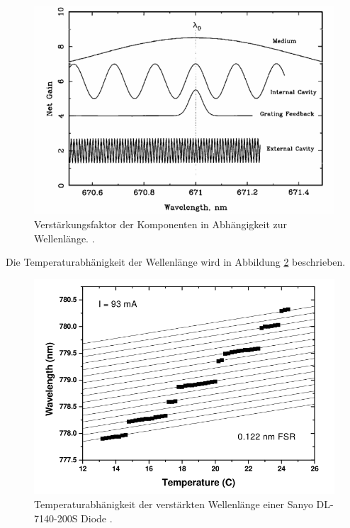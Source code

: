 \begin{figure}
    \centering
    \includegraphics[scale=0.50]{bilder/net_gain.png}
    \caption{Verstärkungsfaktor der Komponenten in Abhängigkeit zur Wellenlänge. \cite{diode_laser_spectroscopy}.}
    \label{fig:net_gain}
\end{figure}

Die Temperaturabhänigkeit der Wellenlänge wird in Abbildung \ref{fig:temperatur} beschrieben.

\begin{figure}
    \centering
    \includegraphics[scale=0.55]{bilder/temperatur.png}
    \caption{Temperaturabhänigkeit der verstärkten Wellenlänge einer Sanyo DL-7140-200S Diode \cite{diode_laser_spectroscopy}.}
    \label{fig:temperatur}
\end{figure}

